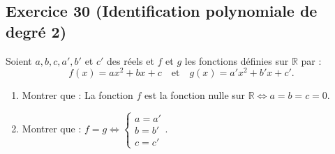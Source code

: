\documentclass[11pt,a4paper]{article}
\begin{document}
\subsection*{Exercice 30 (Identification polynomiale de degré 2)}
Soient $a, b, c, a', b'$ et $c'$ des réels et $f$ et $g$ les fonctions définies sur $\mathbb{R}$ par :
\[
f(x) = ax^2 + bx + c \quad \text{et} \quad g(x) = a'x^2 + b'x + c'.
\]
\begin{enumerate}
    \item Montrer que : La fonction $f$ est la fonction nulle sur $\mathbb{R} \iff a = b = c = 0$.
    \item Montrer que : $f = g \iff \begin{cases} a = a' \\ b = b' \\ c = c' \end{cases}$.
\end{enumerate}
\end{document}
